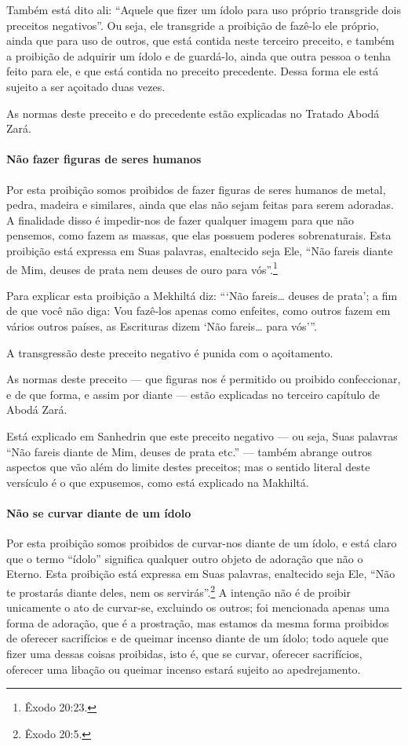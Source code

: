 Também está dito ali: ``Aquele que fizer um ídolo para uso próprio
transgride dois preceitos negativos''. Ou seja, ele transgride a
proibição de fazê-lo ele próprio, ainda que para uso de outros, que está
contida neste terceiro preceito, e também a proibição de adquirir um
ídolo e de guardá-lo, ainda que outra pessoa o tenha feito para ele, e
que está contida no preceito precedente. Dessa forma ele está sujeito a
ser açoitado duas vezes.

As normas deste preceito e do precedente estão explicadas no Tratado
Abodá Zará.

\paragraph{Não fazer figuras de seres humanos}

Por esta proibição somos proibidos de fazer figuras de seres humanos de
metal, pedra, madeira e similares, ainda que elas não sejam feitas para
serem adoradas. A finalidade disso é impedir-nos de fazer qualquer
imagem para que não pensemos, como fazem as massas, que elas possuem
poderes sobrenaturais. Esta proibição está expressa em Suas palavras,
enaltecido seja Ele, ``Não fareis diante de Mim, deuses de prata nem
deuses de ouro para vós''.\footnote{Êxodo 20:23.}

Para explicar esta proibição a Mekhiltá diz: ```Não fareis\ldots{} deuses de
prata'; a fim de que você não diga: Vou fazê-los apenas como enfeites,
como outros fazem em vários outros países, as Escrituras dizem `Não
fareis\ldots{} para vós'''.

A transgressão deste preceito negativo é punida com o açoitamento.

As normas deste preceito --- que figuras nos é permitido ou proibido
confeccionar, e de que forma, e assim por diante --- estão explicadas no
terceiro capítulo de Abodá Zará.

Está explicado em Sanhedrin que este preceito negativo --- ou seja, Suas
palavras ``Não fareis diante de Mim, deuses de prata etc.'' --- também
abrange outros aspectos que vão além do limite destes preceitos; mas o
sentido literal deste versículo é o que expusemos, como está explicado
na Makhiltá.

\paragraph{Não se curvar diante de um ídolo}

Por esta proibição somos proibidos de curvar-nos diante de um ídolo, e
está claro que o termo ``ídolo'' significa qualquer outro objeto de
adoração que não o Eterno. Esta proibição está expressa em Suas
palavras, enaltecido seja Ele, ``Não te prostarás diante deles, nem os
servirás''.\footnote{Êxodo 20:5.} A intenção não é de proibir unicamente o ato de
curvar-se, excluindo os outros; foi mencionada apenas uma forma de
adoração, que é a prostração, mas estamos da mesma forma proibidos de
oferecer sacrifícios e de queimar incenso diante de um ídolo; todo
aquele que fizer uma dessas coisas proibidas, isto é, que se curvar,
oferecer sacrifícios, oferecer uma libação ou queimar incenso estará
sujeito ao apedrejamento.

